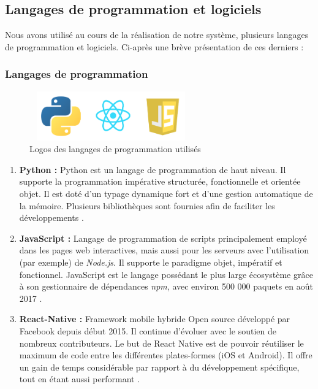 \subsection{Langages de programmation et logiciels}\label{def-tools}
    Nous avons utilisé au cours de la réalisation de notre système, plusieurs langages de programmation et logiciels. Ci-après une brève présentation de ces derniers :
        \subsubsection{Langages de programmation}\label{react-native-def}
            \begin{figure}[H]
                    \centering
                    \includegraphics[height=60pt,width=200pt]{img/chapter4/tools/language.png}
                    \caption{Logos des langages de programmation utilisés}
                    \label{}
            \end{figure}
            \begin{enumerate}[leftmargin=*]
                \item{\textbf{Python : }}
                Python est un langage de programmation de haut niveau. Il supporte la programmation impérative structurée, fonctionnelle et orientée objet. Il est doté d'un typage dynamique fort et d'une gestion automatique de la mémoire. Plusieurs bibliothèques sont fournies afin de faciliter les développements \cite{python}.\\

                \item{\textbf{JavaScript : }}
                Langage de programmation de scripts principalement employé dans les pages web interactives, mais aussi pour les serveurs avec l'utilisation (par exemple) de \emph{Node.js}. Il supporte le paradigme objet, impératif et fonctionnel. JavaScript est le langage possédant le plus large écosystème grâce à son gestionnaire de dépendances \emph{npm}, avec environ 500 000 paquets en août 2017 \cite{javascript}.\\

                \item{\textbf{React-Native : }}
                Framework mobile hybride Open source développé par Facebook depuis début 2015. Il continue d'évoluer avec le soutien de nombreux contributeurs. Le but de React Native est de pouvoir réutiliser le maximum de code entre les différentes plates-formes (iOS et Android). Il offre un gain de temps considérable par rapport à du développement spécifique, tout en étant aussi performant \cite{reactnative}.
            \end{enumerate}

